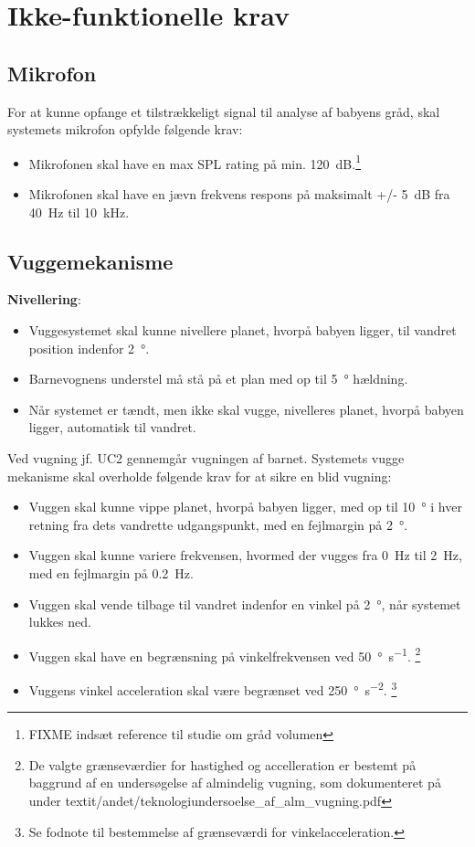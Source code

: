 \section{Ikke-funktionelle krav}

\subsection*{Mikrofon}
For at kunne opfange et tilstrækkeligt signal til analyse af babyens gråd, skal systemets mikrofon opfylde følgende krav:
\begin{itemize}
\item Mikrofonen skal have en max SPL rating på min. \SI{120}{\dB}.\footnote{FIXME indsæt reference til studie om gråd volumen}
\item Mikrofonen skal have en jævn frekvens respons på maksimalt +/- \SI{5}{\dB} fra \SI{40}{\hertz} til \SI{10}{\kilo\hertz}.
\end{itemize}

\subsection*{Vuggemekanisme}

\textbf{Nivellering}: \label{kravspec:ikke_funk_nivellering}
\begin{itemize}
	\item Vuggesystemet skal kunne nivellere planet, hvorpå babyen ligger, til vandret position indenfor \SI{2}{\degree}.
	\item Barnevognens understel må stå på et plan med op til \SI{5}{\degree} hældning.
	\item Når systemet er tændt, men ikke skal vugge, nivelleres planet, hvorpå babyen ligger, automatisk til vandret.
\end{itemize}

Ved vugning jf. UC2 gennemgår vugningen af barnet.
Systemets vugge mekanisme skal overholde følgende krav for at sikre en blid vugning:
\begin{itemize}
\item Vuggen skal kunne vippe planet, hvorpå babyen ligger, med op til \SI{10}{\degree} i hver retning fra dets vandrette udgangspunkt, med en fejlmargin på \SI{2}{\degree}.
\item Vuggen skal kunne variere frekvensen, hvormed der vugges fra \SI{0}{\hertz} til \SI{2}{\hertz}, med en fejlmargin på \SI{0.2}{\hertz}.
\item Vuggen skal vende tilbage til vandret indenfor en vinkel på \SI{2}{\degree}, når systemet lukkes ned.
\item Vuggen skal have en begrænsning på vinkelfrekvensen ved \SI{50}{\degree\per\second}. \footnote{De valgte grænseværdier for hastighed og accelleration er bestemt på baggrund af en undersøgelse af almindelig vugning, som dokumenteret på \citep{cd} under textit{/andet/teknologiundersoelse\_af\_alm\_vugning.pdf}}
\item Vuggens vinkel acceleration skal være begrænset ved \SI{250}{\degree\per\square\second}. \footnote{Se fodnote til bestemmelse af grænseværdi for vinkelacceleration.}
\end{itemize}

